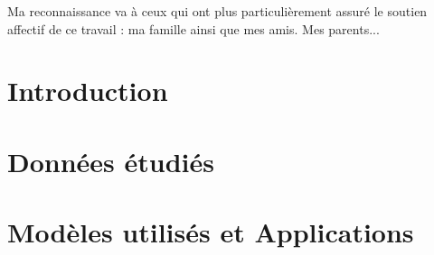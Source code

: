 \documentclass[a4paper, oneside, french, 12pt, final]{extreport}
\newcommand{\studyDepartment} {%
  Entreprise d'accueil %
}
\newcommand{\juryPresident} {%
  Mr Ben Foulen \textsc{Foulenia}%
}
\newcommand{\juryMemberOne} {%
  Ms Ben Foulena \textsc{Foulen}%
}
\newcommand{\juryMemberTwo} {%
  Mr Ben Foulen \textsc{Fouleni}%
}
\newcommand{\juryMemberThree} {%
	M. Ben Foulen \textsc{Fouleni}%
}
\begin{document}


Ma reconnaissance va à ceux qui ont plus particulièrement assuré le soutien affectif de ce travail : ma famille ainsi que mes amis. Mes parents... 




\tableofcontents

\listoffigures
\listoftables
\listofalgorithms
{}

\newpage
{}
\chapter*{Introduction}
\label{chap:general_intorduction}



\chapter{Données étudiés}%
\label{chap:chapterone}


\chapter{Modèles utilisés et Applications}
\label{chap:2}

\end{document}
